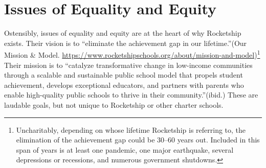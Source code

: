\section{Issues of Equality and Equity}\indent%
\label{sec:issues_equality_equity}

Ostensibly, issues of equality and equity are at the heart of why Rocketship exists. Their vision is to ``eliminate the achievement gap in our lifetime.''(Our Mission \& Model. \url{https://www.rocketshipschools.org/about/mission-and-model})\footnote{Uncharitably, depending on whose lifetime Rocketship is referring to, the elimination of the achievement gap could be 30–60 years out. Included in this span of years is at least one pandemic, one major earthquake, several depressions or recessions, and numerous government shutdowns.} Their mission is to ``catalyze transformative change in low-income communities through a scalable and sustainable public school model that propels student achievement, develops exceptional educators, and partners with parents who enable high-quality public schools to thrive in their community.''(ibid.) These are laudable goals, but not unique to Rocketship or other charter schools.

